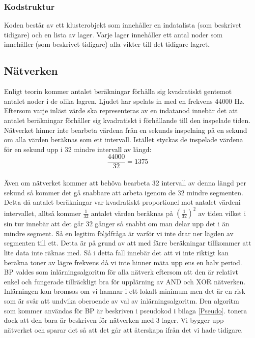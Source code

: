 \documentclass[a4paper,10pt]{article}
\begin{document}
\subsubsection{Kodstruktur}
Koden består av ett klusterobjekt som innehåller en indatalista (som beskrivet tidigare) och en lista av lager. Varje lager innehåller ett antal noder som innehåller (som beskrivet tidigare) alla vikter till det tidigare lagret.

\subsection{Nätverken}
Enligt teorin kommer antalet beräkningar förhålla sig kvadratiskt gentemot antalet noder i de olika lagren. Ljudet har spelats in med en frekvens 44000 Hz. Eftersom varje inläst värde ska representeras av en indatanod innebär det att antalet beräkningar förhåller sig kvadratiskt i förhållande till den inspelade tiden. Nätverket hinner inte bearbeta värdena från en sekunds inspelning på en sekund om alla värden beräknas som ett intervall. Istället styckas de inspelade värdena för en sekund upp i 32 mindre intervall av längd: \\
	\[\dfrac{44000}{32} = 1375\]  \\
Även om nätverket kommer att behöva bearbeta 32 intervall av denna längd per sekund så kommer det gå snabbare att arbeta igenom de 32 mindre segmenten. Detta då antalet beräkningar var kvadratiskt proportionel mot antalet värdeni intervallet, alltså kommer $\frac{1}{32}$ antalet värden beräknas på $(\frac{1}{32})^2$ av tiden vilket i sin tur innebär att det går 32 gånger så snabbt om man delar upp det i än mindre segment. Så en legitim följdfråga är varför vi inte drar ner lägden av segmenten till ett. Detta är på grund av att med färre beräkningar tillkommer att lite data inte räknas med. Så i detta fall innebär det att vi inte riktigt kan beräkna toner av lägre frekvens då vi inte hinner mäta upp ens en halv period. 
BP valdes som inlärningsalgoritm för alla nätverk eftersom att den är relativt enkel och fungerade tillräckligt bra för upplärning av AND och XOR nätverken. Inlärningen kan bromsas om vi hamnar i ett lokalt minimum\autocite{NNDL} men det är en risk som är svår att undvika oberoende av val av inlärningsalgoritm.
Den algoritm som kommer användas för BP är beskriven i pseudokod i bilaga \ref{Pseudo}. tonera dock att den bara är beskriven för nätverken med 3 lager. Vi bygger upp nätverket och sparar det så att det går att återskapa ifrån det vi hade tidigare. 
\end{document}
